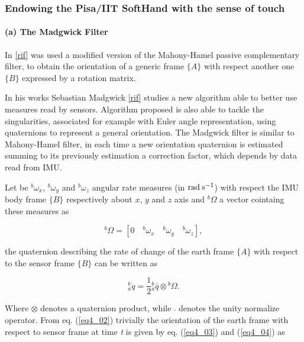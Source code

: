 
\subsubsection{Endowing the Pisa/IIT SoftHand with the sense of touch}
\label{sec:SenseOfTouch}


\paragraph{(a) The Madgwick Filter}



In \ref{rif} was used a modified version of the Mahony-Hamel passive complementary filter, to obtain the orientation of a generic frame $\{ A \}$ with respect another one $\{ B \}$ expressed by a rotation matrix.  

In his works Sebastian Madgwick \ref{rif} studies a new algorithm able to better use measures read by sensors. Algorithm proposed is also able to tackle the singularities, associated for example with Euler angle representation, using quaternions to represent a general orientation. The Madgwick filter is similar to Mahony-Hamel filter, in each time a new orientation quaternion is estimated summing to its previously estimation a correction factor, which depends by
data read from IMU.

Let be ${^b\omega_x}$, ${^b\omega_y}$ and ${^b\omega_z}$ angular rate measures (in $\operatorname{rad} s^{-1}$) with respect the IMU body frame $\{ B \}$ respectively about $x$, $y$ and $z$ axis and $^{b}\Omega$ a vector cointaing these measures as

\begin{equation}
\label{eq4_01}
^b \Omega = [ 0 \quad {^b\omega_x} \quad {^b\omega_y} \quad {^b\omega_z} ],
\end{equation}

\noindent the quaternion describing the rate of change of the earth frame $\{ A \}$ with respect to the sensor frame $\{ B \}$ can be written as

\begin{equation}
\label{eq4_02}
^b_a\dot{q} = \frac{1}{2} {^b_a \bar{q}}  \otimes {^b\Omega}.
\end{equation}

\noindent Where $\otimes$ denotes a quaternion product, while $\bar{}$ denotes the unity normalize operator. From eq. (\ref{eq4_02}) trivially the orientation of the earth frame with respect to sensor frame at time \textit{t} is given by eq. (\ref{eq4_03}) and (\ref{eq4_04}) as


